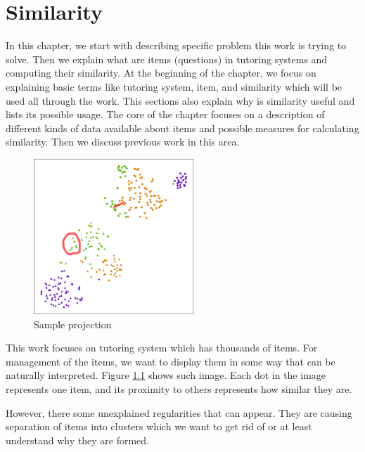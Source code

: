 \documentclass[
  digital, %
  table,   %
  nolof,     %
  nolot,     %
  nocover,
  color,
  final, %
]{fithesis3}
\begin{document}

\chapter{Similarity}


In this chapter, we start with describing specific problem this work is trying to solve. Then we explain what are items (questions) in tutoring systems and computing their similarity. At the beginning of the chapter, we focus on explaining basic terms like tutoring system, item, and similarity which will be used all through the work. This sections also explain why is similarity useful and lists its possible usage.  The core of the chapter focuses on a description of different kinds of data available about items and possible measures for calculating similarity. Then we discuss previous work in this area.


\begin{figure}
    \includegraphics[width=6cm]{img/sample_projection}
  \caption{Sample projection}
  \label{fig:sample_projection}
\end{figure}

This work focuses on tutoring system \umimeCesky{} which has thousands of items. For management of the items, we want to display them in some way that can be naturally interpreted. Figure \ref{fig:sample_projection} shows such image. Each dot in the image represents one item, and its proximity to others represents how similar they are.

However, there some unexplained regularities that can appear. They are causing separation of items into clusters which we want to get rid of or at least understand why they are formed.

\end{document}
